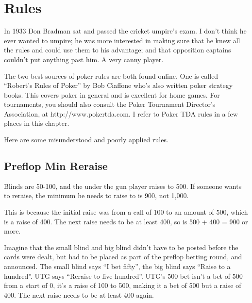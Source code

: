 \chapter{Rules}


In 1933 Don Bradman sat and passed the cricket umpire's exam. I don't
think he ever wanted to umpire; he was more interested in making
sure that he knew all the rules and could use them to his advantage;
and that opposition captains couldn't put anything past him. A very
canny player.

The two best sources of poker rules are both found online.
One is called ``Robert's Rules of Poker'' by Bob Ciaffone
who's also written poker strategy books. This covers
poker in general and is excellent for home games. For tournaments,
you should also consult the Poker Tournament Director's Association,
at http://www.pokertda.com. I refer to Poker TDA rules in a few
places in this chapter.



Here are some misunderstood and poorly applied rules.

\section{Preflop Min Reraise}

Blinds are 50-100, and the under the gun player
raises to 500. If someone wants to reraise, the minimum
he needs to raise to is 900, not 1,000. 

This is because the initial raise was from a call of 100 to an
amount of 500, which is a raise of 400. The next raise needs
to be at least 400, so is 500 + 400 = 900 or more.

Imagine that the small blind and big blind didn't have to be posted
before the cards were dealt, but had to be placed as part of the
preflop betting round, and announced. The small blind says
``I bet fifty'', the big blind says ``Raise to a hundred''.
UTG says ``Reraise to five hundred''. UTG's 500 bet isn't a bet
of 500 from a start of 0, it's a raise of 100 to 500, making it a bet
of 500 but a raise of 400. The next raise needs to be at least 400
again.

